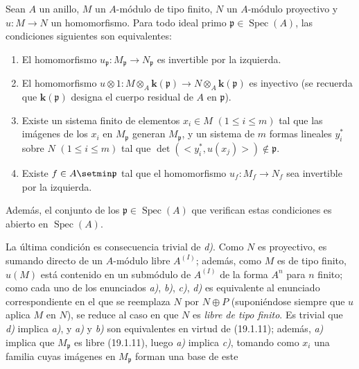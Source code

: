 \begin{corollary}[19.1.12]
\label{0.19.1.12-fr}
Sean $A$ un anillo, $M$ un $A$-módulo de tipo finito, $N$ un $A$-módulo
proyectivo y $u:M\to N$ un homomorfismo. Para todo ideal primo
$\mathfrak p\in\operatorname{Spec}(A)$, las condiciones siguientes son
equivalentes:
\begin{enumerate}
  \item[\textup{a)}] El homomorfismo
  $u_{\mathfrak p}:M_{\mathfrak p}\to N_{\mathfrak p}$ es invertible por la
  izquierda.
  \item[\textup{b)}] El homomorfismo
  $u\otimes1:M\otimes_A\boldsymbol{k}(\mathfrak p)\to N\otimes_A\boldsymbol{k}(\mathfrak p)$ es
  inyectivo \textup{(se recuerda que $\boldsymbol{k}(\mathfrak p)$ designa el cuerpo residual de $A$
  en $\mathfrak p$)}.
  \item[\textup{c)}] Existe un sistema finito de elementos $x_i\in M$
  $(1\leq i\leq m)$ tal que las imágenes de los $x_i$ en $M_{\mathfrak p}$
  generan $M_{\mathfrak p}$, y un sistema de $m$ formas lineales
  $y_i^*$ sobre $N$ $(1\leq i\leq m)$ tal que
  $\det(\mathopen{<}y_i^*,u(x_j)\mathclose{>})\notin\mathfrak p$.
  \item[\textup{d)}] Existe $f\in A\setmin\mathfrak p$ tal que el homomorfismo
  $u_f:M_f\to N_f$ sea invertible por la izquierda.
\end{enumerate}
Además, el conjunto de los $\mathfrak p\in\operatorname{Spec}(A)$ que verifican
estas condiciones es abierto en $\operatorname{Spec}(A)$.
\end{corollary}

La última condición es consecuencia trivial de \emph{d)}. Como $N$ es proyectivo, es
sumando directo de un $A$-módulo libre $A^{(I)}$; además, como $M$ es de tipo
finito, $u(M)$ está contenido en un submódulo de $A^{(I)}$ de la forma $A^n$
para $n$ finito; como cada uno de los enunciados \emph{a)}, \emph{b)}, \emph{c)}, \emph{d)} es equivalente
al enunciado correspondiente en el que se reemplaza $N$ por $N\oplus P$
(suponiéndose siempre que $u$ aplica $M$ en $N$), se reduce al caso en que $N$
es \emph{libre de tipo finito}. Es trivial que \emph{d)} implica \emph{a)}, y \emph{a)} y \emph{b)} son
equivalentes en virtud de (19.1.11); además, \emph{a)} implica que
$M_{\mathfrak p}$ es libre (19.1.11), luego \emph{a)} implica \emph{c)}, tomando como $x_i$
una familia cuyas imágenes en $M_{\mathfrak p}$ forman una base de este


